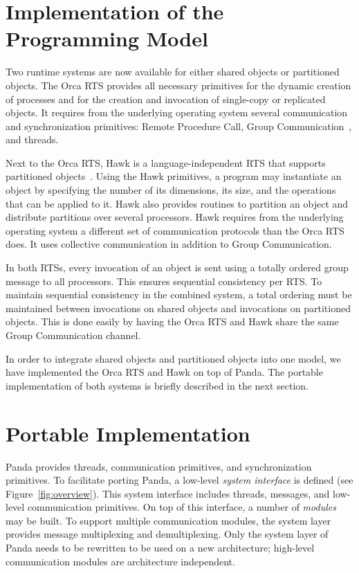 \documentclass{article}
\begin{document}
\section{Implementation of the Programming Model}
\label{sec:implem}

Two runtime systems are now available for either shared objects or
partitioned objects. The Orca RTS provides all necessary primitives
for the dynamic creation of processes and for the creation and
invocation of single-copy or replicated objects. It requires from the
underlying operating system several communication and synchronization
primitives: Remote Procedure Call, Group
Communication~\cite{kaashoek92}, and threads.

Next to the Orca RTS, Hawk is a language-independent RTS that supports
partitioned objects~\cite{hicss96}. Using the Hawk primitives, a
program may instantiate an object by specifying the number of its
dimensions, its size, and the operations that can be applied to it.
Hawk also provides routines to partition an object and distribute
partitions over several processors. Hawk requires from the underlying
operating system a different set of communication protocols than the
Orca RTS does. It uses collective communication in addition to Group
Communication.

In both RTSs, every invocation of an object is sent using a totally
ordered group message to all processors. This ensures sequential
consistency per RTS. To maintain sequential consistency in the
combined system, a total ordering must be maintained between
invocations on shared objects and invocations on partitioned objects.
This is done easily by having the Orca RTS and Hawk share the same
Group Communication channel.

In order to integrate shared objects and partitioned objects into one
model, we have implemented the Orca RTS and Hawk on top of Panda. The
portable implementation of both systems is briefly described in the
next section. 

\section{Portable Implementation}
\label{sec:PandaImplem}

Panda provides threads, communication primitives, and synchronization
primitives. To facilitate porting Panda, a low-level \emph{system
interface} is defined (see Figure~\ref{fig:overview}). This system
interface includes threads, messages, and low-level communication
primitives. On top of this interface, a number of \emph{modules} may
be built. To support multiple communication modules, the system layer
provides message multiplexing and demultiplexing. Only the system
layer of Panda needs to be rewritten to be used on a new architecture;
high-level communication modules are architecture independent.
\end{document}

